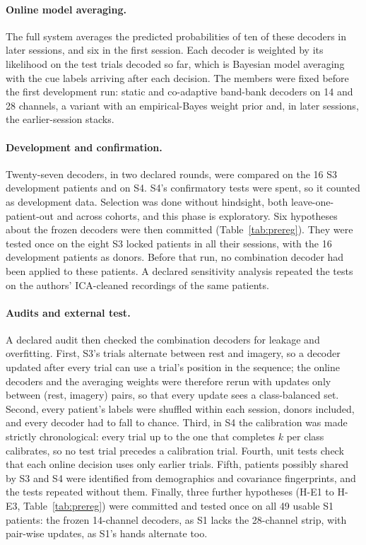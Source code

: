 \documentclass[11pt]{article}
\begin{document}
\paragraph{Online model averaging.} The full system averages the predicted probabilities of ten of these decoders in later sessions, and six in the first session. Each decoder is weighted by its likelihood on the test trials decoded so far, which is Bayesian model averaging with the cue labels arriving after each decision. The members were fixed before the first development run: static and co-adaptive band-bank decoders on 14 and 28 channels, a variant with an empirical-Bayes weight prior and, in later sessions, the earlier-session stacks.

\paragraph{Development and confirmation.} Twenty-seven decoders, in two declared rounds, were compared on the 16 S3 development patients and on S4. S4's confirmatory tests were spent, so it counted as development data. Selection was done without hindsight, both leave-one-patient-out and across cohorts, and this phase is exploratory. Six hypotheses about the frozen decoders were then committed (Table~\ref{tab:prereg}). They were tested once on the eight S3 locked patients in all their sessions, with the 16 development patients as donors. Before that run, no combination decoder had been applied to these patients. A declared sensitivity analysis repeated the tests on the authors' ICA-cleaned recordings of the same patients.

\paragraph{Audits and external test.} A declared audit then checked the combination decoders for leakage and overfitting. First, S3's trials alternate between rest and imagery, so a decoder updated after every trial can use a trial's position in the sequence; the online decoders and the averaging weights were therefore rerun with updates only between (rest, imagery) pairs, so that every update sees a class-balanced set. Second, every patient's labels were shuffled within each session, donors included, and every decoder had to fall to chance. Third, in S4 the calibration was made strictly chronological: every trial up to the one that completes $k$ per class calibrates, so no test trial precedes a calibration trial. Fourth, unit tests check that each online decision uses only earlier trials. Fifth, patients possibly shared by S3 and S4 were identified from demographics and covariance fingerprints, and the tests repeated without them. Finally, three further hypotheses (H-E1 to H-E3, Table~\ref{tab:prereg}) were committed and tested once on all 49 usable S1 patients: the frozen 14-channel decoders, as S1 lacks the 28-channel strip, with pair-wise updates, as S1's hands alternate too.
\end{document}
